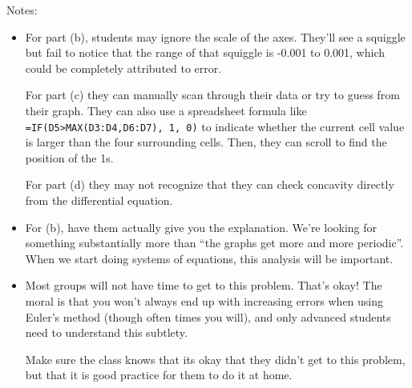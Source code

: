		Notes:
		\begin{itemize}
			\item For part (b), students may ignore the scale of the axes. They'll see a squiggle but fail to notice that the range of that
			squiggle is -0.001 to 0.001, which could be completely attributed to error.

			For part (c) they can manually scan through their data or try to guess from their graph. They can also use a spreadsheet formula
			like \verb|=IF(D5>MAX(D3:D4,D6:D7), 1, 0)| to indicate whether the current cell value is larger than the four surrounding cells.
			Then, they can scroll to find the position of the 1s.

			For part (d) they may not recognize that they can check concavity directly from the differential equation.

			\item For (b), have them actually give you the explanation. We're looking for something substantially more than ``the
			graphs get more and more periodic''. When we start doing systems of equations, this analysis will be important.

			\item Most groups will not have time to get to this problem. That's okay! The moral is that you won't always
			end up with increasing errors when using Euler's method (though often times you will), and only advanced students need
			to understand this subtlety.

			Make sure the class knows that its okay that they didn't get to this problem, but that it is good practice for them to do it at home.
		\end{itemize}
